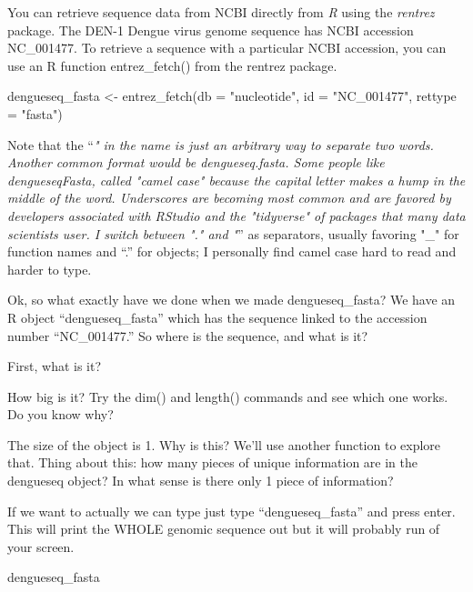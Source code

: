 \documentclass[
]{book}
\newenvironment{Shaded}{\begin{snugshade}}{\end{snugshade}}
\newcommand{\AttributeTok}[1]{\textcolor[rgb]{0.77,0.63,0.00}{#1}}
\newcommand{\FunctionTok}[1]{\textcolor[rgb]{0.00,0.00,0.00}{#1}}
\newcommand{\NormalTok}[1]{#1}
\newcommand{\OtherTok}[1]{\textcolor[rgb]{0.56,0.35,0.01}{#1}}
\newcommand{\StringTok}[1]{\textcolor[rgb]{0.31,0.60,0.02}{#1}}
\begin{document}
You can retrieve sequence data from NCBI directly from \emph{R} using the \emph{rentrez} package. The DEN-1 Dengue virus genome sequence has NCBI accession NC\_001477. To retrieve a sequence with a particular NCBI accession, you can use an R function entrez\_fetch() from the rentrez package.

\begin{Shaded}
\begin{Highlighting}[]
\NormalTok{dengueseq\_fasta }\OtherTok{\textless{}{-}} \FunctionTok{entrez\_fetch}\NormalTok{(}\AttributeTok{db =} \StringTok{"nucleotide"}\NormalTok{, }
                          \AttributeTok{id =} \StringTok{"NC\_001477"}\NormalTok{, }
                          \AttributeTok{rettype =} \StringTok{"fasta"}\NormalTok{)}
\end{Highlighting}
\end{Shaded}

Note that the ``\emph{" in the name is just an arbitrary way to separate two words. Another common format would be dengueseq.fasta. Some people like dengueseqFasta, called "camel case" because the capital letter makes a hump in the middle of the word. Underscores are becoming most common and are favored by developers associated with RStudio and the "tidyverse" of packages that many data scientists user. I switch between "." and "}'' as separators, usually favoring "\_" for function names and ``.'' for objects; I personally find camel case hard to read and harder to type.

Ok, so what exactly have we done when we made dengueseq\_fasta? We have an R object ``dengueseq\_fasta'' which has the sequence linked to the accession number ``NC\_001477.'' So where is the sequence, and what is it?

First, what is it?

How big is it? Try the dim() and length() commands and see which one works. Do you know why?

The size of the object is 1. Why is this? We'll use another function to explore that. Thing about this: how many pieces of unique information are in the dengueseq object? In what sense is there only 1 piece of information?

If we want to actually we can type just type ``dengueseq\_fasta'' and press enter. This will print the WHOLE genomic sequence out but it will probably run of your screen.

\begin{Shaded}
\begin{Highlighting}[]
\NormalTok{dengueseq\_fasta}
\end{Highlighting}
\end{Shaded}
\end{document}
